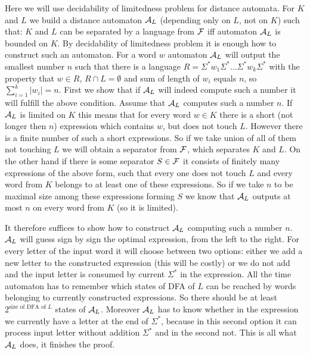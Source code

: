 {
Here we will use decidability of limitedness problem for distance automata. For $K$ and $L$ we build a distance
automaton $\mathcal{A}_L$ (depending only on $L$, not on $K$) such that: $K$ and $L$ can be separated by a language from $\mathcal F$
iff automaton $\mathcal{A}_L$ is bounded on $K$. By decidability of limitedness problem it is enough how to construct such an automaton.
For a word $w$ automaton $\mathcal{A}_L$ will output the smallest number $n$ such that there is a language
$R = \Sigma^* w_1 \Sigma^* \ldots \Sigma^* w_k \Sigma^*$ with the property that $w \in R$, $R \cap L = \emptyset$
and sum of length of $w_i$ equals $n$, so $\sum_{i=1}^k |w_i| = n$. First we show that if $\mathcal{A}_L$ will indeed compute such a number
it will fulfill the above condition. Assume that $\mathcal{A}_L$ computes such a number $n$. If $\mathcal{A}_L$ is limited on $K$ this
means that for every word $w \in K$ there is a short (not longer then $n$) expression which contains $w$, but does not touch $L$.
However there is a finite number of such a short expressions. So if we take union of all of them not touching $L$ we will obtain
a separator from $\mathcal F$, which separates $K$ and $L$. On the other hand if there is some separator $S \in \mathcal F$ it consists
of finitely many expressions of the above form, such that every one does not touch $L$ and every word from $K$ belongs
to at least one of these expressions. So if we take $n$ to be maximal size among these expressions forming $S$ we
know that $\mathcal{A}_L$ outputs at most $n$ on every word from $K$ (so it is limited).

It therefore suffices to show how to construct $\mathcal{A}_L$ computing such a number $n$.
$\mathcal{A}_L$ will guess sign by sign the optimal expression, from the left to the right.
For every letter of the input word it will choose between two options: either we add a new letter to the constructed
expression (this will be costly) or we do not add and the input letter is consumed by current $\Sigma^*$ in the expression.
All the time automaton has to remember which states of DFA of $L$ can be reached by words belonging to currently constructed
expressions. So there should be at least $2^{\text{size of DFA of $L$}}$ states of $\mathcal{A}_L$. Moreover $\mathcal{A}_L$ has to know whether
in the expression we currently have a letter at the end of $\Sigma^*$, because in this second option it can process
input letter without addition $\Sigma^*$ and in the second not. This is all what $\mathcal{A}_L$ does, it finishes the proof.
}



{
}


